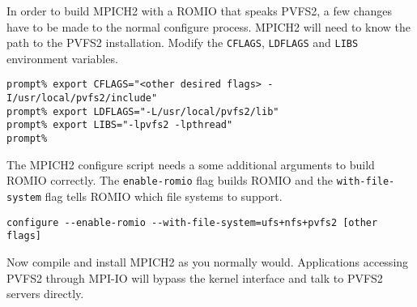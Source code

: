 \documentclass[11pt, letterpaper]{article}
\begin{document}
In order to build MPICH2 with a ROMIO that speaks PVFS2, a few changes
have to be made to the normal configure process.  MPICH2 will need to
know the path to the PVFS2 installation.  Modify the {\tt CFLAGS},
{\tt LDFLAGS} and {\tt LIBS} environment variables.

\begin{verbatim}
prompt% export CFLAGS="<other desired flags> -I/usr/local/pvfs2/include"
prompt% export LDFLAGS="-L/usr/local/pvfs2/lib"
prompt% export LIBS="-lpvfs2 -lpthread"
prompt%
\end{verbatim}

The MPICH2 configure script needs a some additional arguments to build
ROMIO correctly.  The {\tt enable-romio} flag builds ROMIO and  the
{\tt with-file-system} flag tells ROMIO which file systems to support. 

\begin{verbatim}
configure --enable-romio --with-file-system=ufs+nfs+pvfs2 [other flags]
\end{verbatim}

Now compile and install MPICH2 as you normally would.  Applications accessing
PVFS2 through MPI-IO will bypass the kernel interface and talk to PVFS2 servers directly.  
\end{document}

